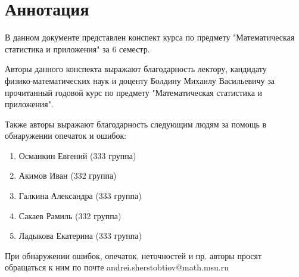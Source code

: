 \section*{Аннотация}

В данном документе представлен конспект курса по
предмету "Математическая статистика и приложения"
за 6 семестр.

Авторы данного конспекта выражают благодарность лектору, кандидату \\ физико-математических наук и доценту
Болдину Михаилу Васильевичу за прочитанный годовой курс по предмету
"Математическая статистика и приложения".

Также авторы выражают благодарность следующим людям за помощь
в обнаружении опечаток и ошибок:
\begin{enumerate}
    \item Османкин Евгений (333 группа)
    \item Акимов Иван (332 группа)
    \item Галкина Александра (333 группа)
    \item Сакаев Рамиль (332 группа)
    \item Ладыкова Екатерина (333 группа)
\end{enumerate}

При обнаружении ошибок, опечаток, неточностей и пр. авторы просят
обращаться к ним по почте andrei.sherstobtiov@math.msu.ru